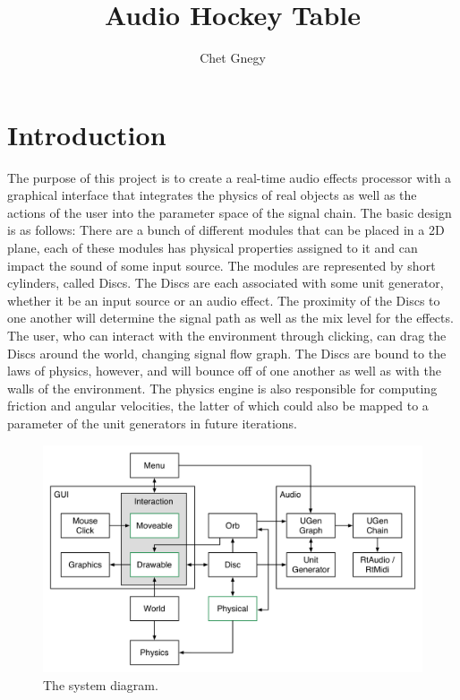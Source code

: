 \documentclass[pdftext,twoside,10pt]{article}
\title{Audio Hockey Table}
\author{Chet Gnegy}
\begin{document}
\maketitle

\section{Introduction}
The purpose of this project is to create a real-time audio effects processor with a graphical interface that integrates the physics of real objects as well as the actions of the user into the parameter space of the signal chain. The basic design is as follows: There are a bunch of different modules that can be placed in a 2D plane, each of these modules has physical properties assigned to it and can impact the sound of some input source. The modules are represented by short cylinders, called Discs. The Discs are each associated with some unit generator, whether it be an input source or an audio effect. The proximity of the Discs to one another will determine the signal path as well as the mix level for the effects. The user, who can interact with the environment through clicking, can drag the Discs around the world, changing signal flow graph. The Discs are bound to the laws of physics, however, and will bounce off of one another as well as with the walls of the environment. The physics engine is also responsible for computing friction and angular velocities, the latter of which could also be mapped to a parameter of the unit generators in future iterations.


\begin{figure}[b!]
  \centering
    \includegraphics[width=\textwidth]{flow.png}
    \caption{The system diagram.}
  
\end{figure}
\end{document}
